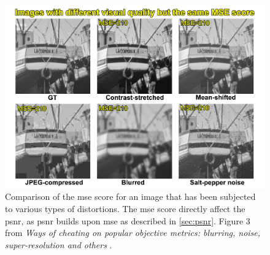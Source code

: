 \begin{figure}[ht]
    \centering
    \includegraphics[width=1.0\textwidth]{figures/psnr-critique.png}
    \caption[PSNR critique]{Comparison of the \acrshort{mse} score for an image that has been subjected to various types of distortions. The \acrshort{mse} score directly affect the \acrshort{psnr}, as \acrshort{psnr} builds upon \acrshort{mse} as described in \autoref{sec:psnr}. Figure 3 from \textit{Ways of cheating on popular objective metrics: blurring, noise, super-resolution and others} \cite{vpqrg}.}
    \label{fig:psnr-critique}
\end{figure}